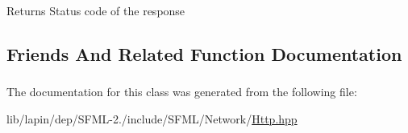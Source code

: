 \begin{DoxyReturn}{Returns}
Status code of the response 
\end{DoxyReturn}


\subsection{Friends And Related Function Documentation}
\hypertarget{classsf_1_1_http_1_1_response_ad44371f4a337a0f6537733cdf6df8e76}{
\subsubsection[{Http}]{\hspace{0.3cm}{\ttfamily [friend]}}}\label{classsf_1_1_http_1_1_response_ad44371f4a337a0f6537733cdf6df8e76}


The documentation for this class was generated from the following file\-:\begin{DoxyCompactItemize}
\item 
lib/lapin/dep/\-S\-F\-M\-L-\/2./include/\-S\-F\-M\-L/\-Network/\hyperlink{lapin_2dep_2_s_f_m_l-2_83_2include_2_s_f_m_l_2_network_2_http_8hpp}{Http.\-hpp}\end{DoxyCompactItemize}
